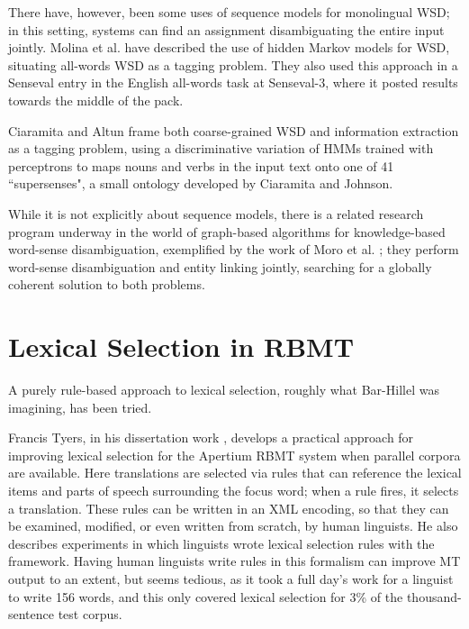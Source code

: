 There have, however, been some uses of sequence models for monolingual WSD; in
this setting, systems can find an assignment disambiguating the entire input
jointly.  Molina et al. \cite{DBLP:conf/iberamia/MolinaPS02} have described the
use of hidden Markov models for WSD, situating all-words WSD as a tagging
problem.  They also used this approach in a Senseval entry
\cite{molina-pla-segarra:2004:Senseval-3} in the English all-words task at
Senseval-3, where it posted results towards the middle of the pack.

Ciaramita and Altun \cite{ciaramita-altun:2006:EMNLP} frame both coarse-grained
WSD and information extraction as a tagging problem, using a discriminative
variation of HMMs trained with perceptrons \cite{collins:2002:EMNLP02}
to maps nouns and verbs in the input text onto one of 41 ``supersenses", a
small ontology developed by Ciaramita and Johnson.

While it is not explicitly about sequence models, there is a related research
program underway in the world of graph-based algorithms for knowledge-based
word-sense disambiguation, exemplified by the work of Moro et al.
\cite{DBLP:journals/tacl/0001RN14}; they perform word-sense disambiguation and
entity linking jointly, searching for a globally coherent solution to both
problems.

\section{Lexical Selection in RBMT}

A purely rule-based approach to lexical selection, roughly what Bar-Hillel was
imagining, has been tried.





Francis Tyers, in his dissertation work \cite{tyers-dissertation}, develops a
practical approach for improving lexical selection for the Apertium RBMT
system when parallel corpora are available.
Here translations are selected via rules that can reference the lexical items
and parts of speech surrounding the focus word; when a rule fires, it selects a
translation. These rules can be written in an XML encoding, so that they can be
examined, modified, or even written from scratch, by human linguists.
He also describes experiments in which linguists wrote lexical selection rules
with the framework. Having human linguists write rules in this formalism can
improve MT output to an extent, but seems tedious, as it took a full day's work
for a linguist to write 156 words, and this only covered lexical selection for
3\% of the thousand-sentence test corpus.


